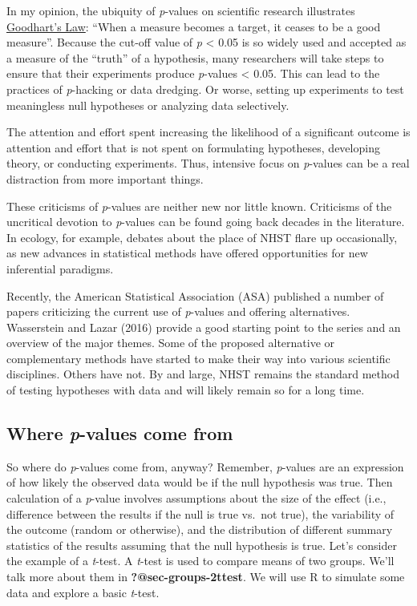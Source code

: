\documentclass[
  13,
  letterpaper,
]{report}
\begin{document}
In my opinion, the ubiquity of \emph{p}-values on scientific research
illustrates
\href{https://en.wikipedia.org/wiki/Goodhart\%27s_law}{Goodhart's Law}:
``When a measure becomes a target, it ceases to be a good measure''.
Because the cut-off value of \emph{p} \textless{} 0.05 is so widely used
and accepted as a measure of the ``truth'' of a hypothesis, many
researchers will take steps to ensure that their experiments produce
\emph{p}-values \textless{} 0.05. This can lead to the practices of
\emph{p}-hacking or data dredging. Or worse, setting up experiments to
test meaningless null hypotheses or analyzing data selectively.

The attention and effort spent increasing the likelihood of a
significant outcome is attention and effort that is not spent on
formulating hypotheses, developing theory, or conducting experiments.
Thus, intensive focus on \emph{p}-values can be a real distraction from
more important things.

These criticisms of \emph{p}-values are neither new nor little known.
Criticisms of the uncritical devotion to \emph{p}-values can be found
going back decades in the literature. In ecology, for example, debates
about the place of NHST flare up occasionally, as new advances in
statistical methods have offered opportunities for new inferential
paradigms.

Recently, the American Statistical Association (ASA) published a number
of papers criticizing the current use of \emph{p}-values and offering
alternatives. Wasserstein and Lazar (2016) provide a good starting point
to the series and an overview of the major themes. Some of the proposed
alternative or complementary methods have started to make their way into
various scientific disciplines. Others have not. By and large, NHST
remains the standard method of testing hypotheses with data and will
likely remain so for a long time.

\subsection{\texorpdfstring{Where \emph{p}-values come
from}{Where p-values come from}}\label{where-p-values-come-from}

So where do \emph{p}-values come from, anyway? Remember, \emph{p}-values
are an expression of how likely the observed data would be if the null
hypothesis was true. Then calculation of a \emph{p}-value involves
assumptions about the size of the effect (i.e., difference between the
results if the null is true vs.~not true), the variability of the
outcome (random or otherwise), and the distribution of different summary
statistics of the results assuming that the null hypothesis is true.
Let's consider the example of a \emph{t}-test. A \emph{t}-test is used
to compare means of two groups. We'll talk more about them in
\textbf{?@sec-groups-2ttest}. We will use R to simulate some data and
explore a basic \emph{t}-test.
\end{document}
